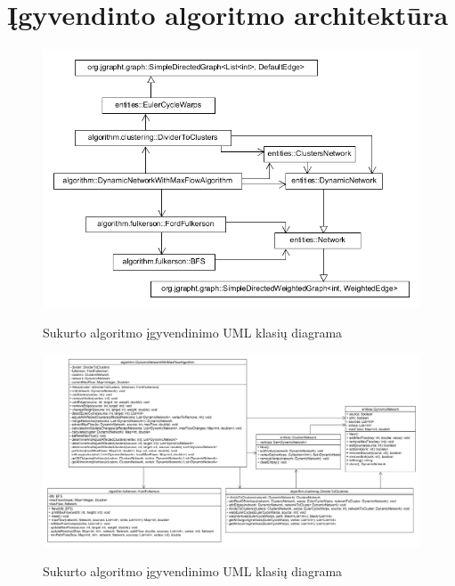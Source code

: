 \documentclass{VUMIFInfBakalaurinis}
\begin{document}
\printbibliography[heading=bibintoc] %

\appendix  %

\section{Įgyvendinto algoritmo architektūra}
\begin{figure}[h]
	\caption{Sukurto algoritmo įgyvendinimo UML klasių diagrama}
	\centering
	\includegraphics[width=\textwidth]{img/architecture.png}
	\label{fig:architecture}
\end{figure}

\begin{figure}[h]
	\caption{Sukurto algoritmo įgyvendinimo UML klasių diagrama}
	\centering
	\includegraphics[width=1.5\textwidth, height=0.5\textheight, angle=90]{img/architecture0.png}
	\label{fig:architecture0}
\end{figure}
\end{document}
